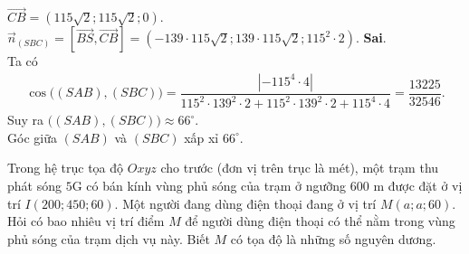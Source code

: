 \begin{ex}
{\begin{itemchoice}
			$\vec{CB}=\left(115\sqrt{2};115\sqrt{2};0\right)$.\\
			$\vec{n}_{(SBC)}=\left[\vec{BS},\vec{CB}\right]=\left(-139\cdot 115\sqrt{2};139\cdot 115\sqrt{2};115^2\cdot 2\right)$.
			\itemch \textbf{Sai}.\\
			Ta có
			\begin{align*}
				\cos\big((SAB),(SBC)\big)=\dfrac{\left|-115^4\cdot 4\right|}{115^2\cdot 139^2\cdot 2+115^2\cdot 139^2\cdot 2+115^4\cdot 4}=\dfrac{13225}{32546}.
			\end{align*}
			Suy ra $\big((SAB),(SBC)\big)\approx 66^\circ$.\\
			Góc giữa $(SAB)$ và $(SBC)$ xấp xỉ $66^\circ$.
		\end{itemchoice}
	}
\end{ex}

\begin{bt}%
	Trong hệ trục tọa độ $Oxyz$ cho trước (đơn vị trên trục là mét), một trạm thu phát sóng $5$G có bán kính vùng phủ sóng của trạm ở ngưỡng $600$ m được đặt ở vị trí $I(200 ; 450;60)$. Một người đang dùng điện thoại đang ở vị trí $M(a;a; 60)$. Hỏi có bao nhiêu vị trí điểm $M$ để người dùng điện thoại có thể nằm trong vùng phủ sóng của trạm dịch vụ này. Biết $M$ có tọa độ là những số nguyên dương.
\end{bt}


